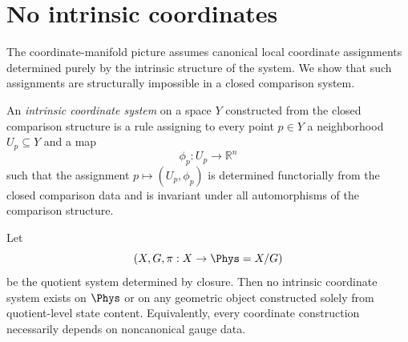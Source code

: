 \section{No intrinsic coordinates}
\label{sec:no-intrinsic-coordinates}
The coordinate-manifold picture assumes canonical local coordinate
assignments determined purely by the intrinsic structure of the system.
We show that such assignments are structurally impossible in a closed
comparison system.
\begin{definition}
	An \emph{intrinsic coordinate system} on a space \(Y\) constructed from
	the closed comparison structure is a rule assigning to every point
	\(p\in Y\) a neighborhood \(U_p\subseteq Y\) and a map
	\[
		\phi_p:U_p\to\mathbb R^n
	\]
	such that the assignment \(p\mapsto(U_p,\phi_p)\) is determined
	functorially from the closed comparison data and is invariant under all
	automorphisms of the comparison structure.
\end{definition}
\begin{theorem}
	\label{thm:no-intrinsic-coordinates}
	Let
	\[
		(X,G,\pi:X\to\Phys=X/G)
	\]
	be the quotient system determined by closure.
	Then no intrinsic coordinate system exists on \(\Phys\) or on any
	geometric object constructed solely from quotient-level state content.
	Equivalently, every coordinate construction necessarily depends on
	noncanonical gauge data.
\end{theorem}

